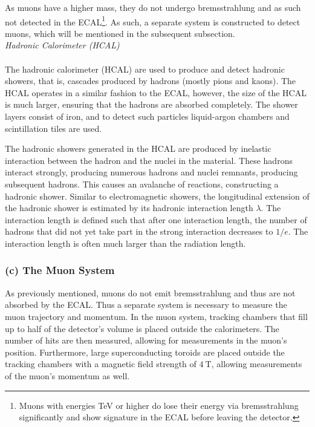 \documentclass[a4paper]{report}
\numberwithin{equation}{section}
\begin{document}
As muons have a higher mass, they do not undergo bremsstrahlung and as such not detected in the ECAL\footnote{Muons with energies TeV or higher do lose their energy via 
bremsstrahlung significantly and show signature in the ECAL before leaving the detector.}. As such, a separate system is constructed to detect muons, which will be mentioned 
in the subsequent subsection. \\

\noindent \textit{Hadronic Calorimeter (HCAL)} \\ \\
The hadronic calorimeter (HCAL) are used to produce and detect hadronic showers, that is, cascades produced by hadrons (mostly pions and kaons). 
The HCAL operates in a similar fashion to the ECAL, however, the size of the HCAL is much larger, ensuring that the hadrons are absorbed completely. The shower layers 
consist of iron, and to detect such particles liquid-argon chambers and scintillation tiles are used. \par 

The hadronic showers generated in the HCAL are produced by inelastic interaction between the hadron and the nuclei in the material. These hadrons interact strongly, 
producing numerous hadrons and nuclei remnants, producing subsequent hadrons. This causes an avalanche of reactions, constructing a hadronic shower. Similar to 
electromagnetic showers, the longitudinal extension of the hadronic shower is estimated by its hadronic interaction length $\lambda$. The interaction length is 
defined such that after one interaction length, the number of hadrons that did not yet take part in the strong interaction decreases to $1 / e$. The interaction 
length is often much larger than the radiation length. 

\subsubsection{(c) The Muon System}

As previously mentioned, muons do not emit bremsstrahlung and thus are not absorbed by the ECAL. Thus a separate system is necessary to measure the muon trajectory 
and momentum. In the muon system, tracking chambers that fill up to half of the detector's volume is placed outside the calorimeters. The number of hits are then 
measured, allowing for measurements in the muon's position. Furthermore, large superconducting toroids are placed outside the tracking chambers with a magnetic 
field strength of $\SI{4}{\tesla}$, allowing measurements of the muon's momentum as well. \\
\end{document}
